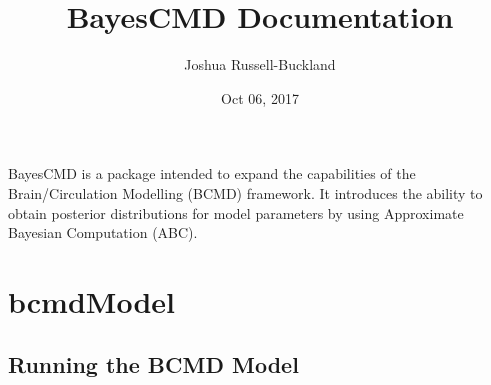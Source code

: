 \documentclass[letterpaper,10pt,english]{sphinxmanual}
\title{BayesCMD Documentation}
\date{Oct 06, 2017}
\author{Joshua Russell-Buckland}
\begin{document}
\maketitle
\sphinxtableofcontents
{}\label{\detokenize{index::doc}}


BayesCMD is a package intended to expand the capabilities of the
Brain/Circulation Modelling (BCMD) framework. It introduces the ability to
obtain posterior distributions for model parameters by using Approximate
Bayesian Computation (ABC).


\chapter{bcmdModel}
\label{\detokenize{bcmdModel:welcome-to-bayescmd-s-documentation}}\label{\detokenize{bcmdModel:bcmdmodel}}\label{\detokenize{bcmdModel::doc}}

\section{Running the BCMD Model}
\label{\detokenize{bcmdModel:module-bayescmd.bcmdModel.bcmd_model}}\label{\detokenize{bcmdModel:running-the-bcmd-model}}
\end{document}
